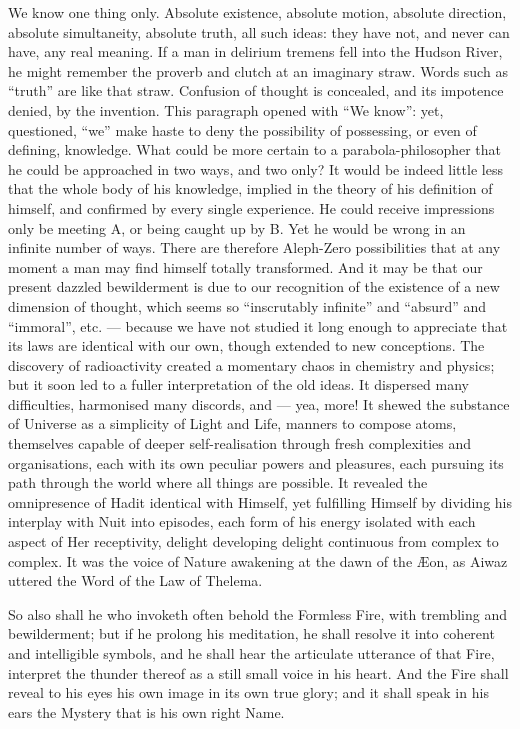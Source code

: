 We know one thing only. Absolute existence, absolute motion, absolute direction, absolute simultaneity, absolute truth, all such ideas: they have not, and never can have, any real meaning. If a man in delirium tremens fell into the Hudson River, he might remember the proverb and clutch at an imaginary straw. Words such as \enquote{truth} are like that straw. Confusion of thought is concealed, and its impotence denied, by the invention. This paragraph opened with \enquote{We know}: yet, questioned, \enquote{we} make haste to deny the possibility of possessing, or even of defining, knowledge. What could be more certain to a parabola-philosopher that he could be approached in two ways, and two only? It would be indeed little less that the whole body of his knowledge, implied in the theory of his definition of himself, and confirmed by every single experience. He could receive impressions only be meeting A, or being caught up by B. Yet he would be wrong in an infinite number of ways. There are therefore Aleph-Zero possibilities that at any moment a man may find himself totally transformed. And it may be that our present dazzled bewilderment is due to our recognition of the existence of a new dimension of thought, which seems so \enquote{inscrutably infinite} and \enquote{absurd} and \enquote{immoral}, etc. --- because we have not studied it long enough to appreciate that its laws are identical with our own, though extended to new conceptions. The discovery of radioactivity created a momentary chaos in chemistry and physics; but it soon led to a fuller interpretation of the old ideas. It dispersed many difficulties, harmonised many discords, and --- yea, more! It shewed the substance of Universe as a simplicity of Light and Life, manners to compose atoms, themselves capable of deeper self-realisation through fresh complexities and organisations, each with its own peculiar powers and pleasures, each pursuing its path through the world where all things are possible. It revealed the omnipresence of Hadit identical with Himself, yet fulfilling Himself by dividing his interplay with Nuit into episodes, each form of his energy isolated with each aspect of Her receptivity, delight developing delight continuous from complex to complex. It was the voice of Nature awakening at the dawn of the \AE{}on, as Aiwaz uttered the Word of the Law of Thelema.

So also shall he who invoketh often behold the Formless Fire, with trembling and bewilderment; but if he prolong his meditation, he shall resolve it into coherent and intelligible symbols, and he shall hear the articulate utterance of that Fire, interpret the thunder thereof as a still small voice in his heart. And the Fire shall reveal to his eyes his own image in its own true glory; and it shall speak in his ears the Mystery that is his own right Name.

